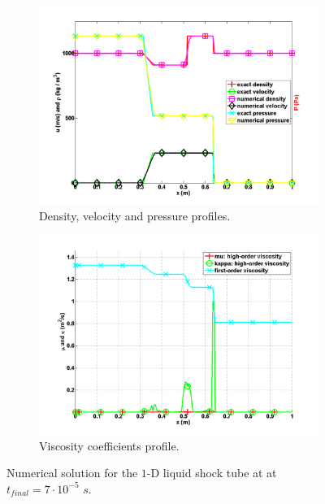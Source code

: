 \documentclass[preprint,10pt]{elsarticle}
\begin{document}
\begin{figure}[H]
        \centering
        \begin{subfigure}[b]{0.495\textwidth}
                \centering
                \includegraphics[width=\textwidth]{LiquidSrongShock_density_velocity_pressure_profiles.png}
                \caption{Density, velocity and pressure profiles.}
                \label{fig:1d_strong_shock_var}
        \end{subfigure}%
        \begin{subfigure}[b]{0.495\textwidth}
                \centering
                \includegraphics[width=\textwidth]{LiquidSrongShock_viscosity.png}
                \caption{Viscosity coefficients profile.}
                \label{fig:1d_strong_shock_visc}
        \end{subfigure}
        \caption{Numerical solution for the $1$-D liquid shock tube at  at $t_{final} = 7 \cdot 10^{-5}$ $s$.}\label{fig:1d_strong_shock}
\end{figure}
\end{document}
